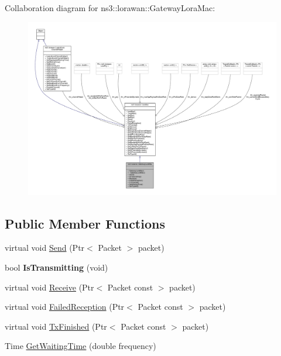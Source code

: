 Collaboration diagram for ns3\+:\+:lorawan\+:\+:Gateway\+Lora\+Mac\+:
\nopagebreak
\begin{figure}[H]
\begin{center}
\leavevmode
\includegraphics[width=350pt]{classns3_1_1lorawan_1_1GatewayLoraMac__coll__graph}
\end{center}
\end{figure}
\subsection*{Public Member Functions}
\begin{DoxyCompactItemize}
\item 
virtual void \hyperlink{classns3_1_1lorawan_1_1GatewayLoraMac_adc8823176576f9d19d4ae663d88d869e}{Send} (Ptr$<$ Packet $>$ packet)
\item 
\mbox{\label{classns3_1_1lorawan_1_1GatewayLoraMac_a2acc1aa214a6bf016e81b7d2fe891173}} 
bool {\bfseries Is\+Transmitting} (void)
\item 
virtual void \hyperlink{classns3_1_1lorawan_1_1GatewayLoraMac_a8e53a57ec381d76bd47f51581b8c0df7}{Receive} (Ptr$<$ Packet const $>$ packet)
\item 
virtual void \hyperlink{classns3_1_1lorawan_1_1GatewayLoraMac_a2d752f0ff766d409e1eb91d7bcd06ad5}{Failed\+Reception} (Ptr$<$ Packet const $>$ packet)
\item 
virtual void \hyperlink{classns3_1_1lorawan_1_1GatewayLoraMac_a115cbb38716b278b7bac756386a5ae77}{Tx\+Finished} (Ptr$<$ Packet const $>$ packet)
\item 
Time \hyperlink{classns3_1_1lorawan_1_1GatewayLoraMac_ae6271138c9d7b29e588e5b59d67b2c66}{Get\+Waiting\+Time} (double frequency)
\end{DoxyCompactItemize}
